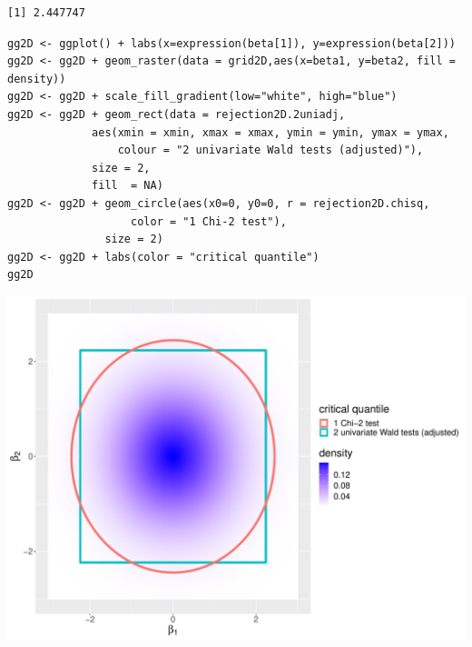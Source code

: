 \documentclass[12pt]{article}
\begin{document}
\begin{verbatim}
[1] 2.447747
\end{verbatim}

\lstset{language=r,label= ,caption= ,captionpos=b,numbers=none}
\begin{lstlisting}
gg2D <- ggplot() + labs(x=expression(beta[1]), y=expression(beta[2]))
gg2D <- gg2D + geom_raster(data = grid2D,aes(x=beta1, y=beta2, fill = density))
gg2D <- gg2D + scale_fill_gradient(low="white", high="blue")
gg2D <- gg2D + geom_rect(data = rejection2D.2uniadj, 
			 aes(xmin = xmin, xmax = xmax, ymin = ymin, ymax = ymax, 
			     colour = "2 univariate Wald tests (adjusted)"), 
			 size = 2,
			 fill  = NA) 
gg2D <- gg2D + geom_circle(aes(x0=0, y0=0, r = rejection2D.chisq, 
			       color = "1 Chi-2 test"),
			   size = 2)
gg2D <- gg2D + labs(color = "critical quantile")
gg2D
\end{lstlisting}

\begin{center}
\includegraphics[width=.9\linewidth]{./figures/2D-test.pdf}
\end{center}
\end{document}
